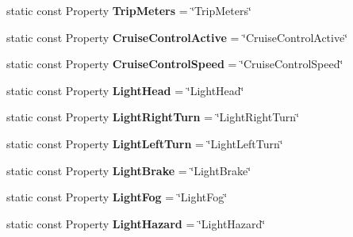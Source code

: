 \begin{DoxyCompactItemize}
\item 
\hypertarget{classVehicleProperty_a893b05cb0e292082070458efa6066e91}{static const Property {\bfseries Trip\+Meters} = \char`\"{}Trip\+Meters\char`\"{}}\label{classVehicleProperty_a893b05cb0e292082070458efa6066e91}

\item 
\hypertarget{classVehicleProperty_a3203c1cb22ff3b530a887228096863e5}{static const Property {\bfseries Cruise\+Control\+Active} = \char`\"{}Cruise\+Control\+Active\char`\"{}}\label{classVehicleProperty_a3203c1cb22ff3b530a887228096863e5}

\item 
\hypertarget{classVehicleProperty_a50c00b5a2d7cfd500a1cd7473124c737}{static const Property {\bfseries Cruise\+Control\+Speed} = \char`\"{}Cruise\+Control\+Speed\char`\"{}}\label{classVehicleProperty_a50c00b5a2d7cfd500a1cd7473124c737}

\item 
\hypertarget{classVehicleProperty_ae98356a8b49f28837a94b13094156e90}{static const Property {\bfseries Light\+Head} = \char`\"{}Light\+Head\char`\"{}}\label{classVehicleProperty_ae98356a8b49f28837a94b13094156e90}

\item 
\hypertarget{classVehicleProperty_a73cfc2a3afd2dc81f495936dfcf46793}{static const Property {\bfseries Light\+Right\+Turn} = \char`\"{}Light\+Right\+Turn\char`\"{}}\label{classVehicleProperty_a73cfc2a3afd2dc81f495936dfcf46793}

\item 
\hypertarget{classVehicleProperty_a4430db4d7c36d7d047766d88f9fc977c}{static const Property {\bfseries Light\+Left\+Turn} = \char`\"{}Light\+Left\+Turn\char`\"{}}\label{classVehicleProperty_a4430db4d7c36d7d047766d88f9fc977c}

\item 
\hypertarget{classVehicleProperty_aa4f2ae234bd0d045b95cf9980e980dd5}{static const Property {\bfseries Light\+Brake} = \char`\"{}Light\+Brake\char`\"{}}\label{classVehicleProperty_aa4f2ae234bd0d045b95cf9980e980dd5}

\item 
\hypertarget{classVehicleProperty_a6eb38fc244331a26b487f7f9beb69b0c}{static const Property {\bfseries Light\+Fog} = \char`\"{}Light\+Fog\char`\"{}}\label{classVehicleProperty_a6eb38fc244331a26b487f7f9beb69b0c}

\item 
\hypertarget{classVehicleProperty_a0d3992f2e0e50bb74baa5e670f6111f0}{static const Property {\bfseries Light\+Hazard} = \char`\"{}Light\+Hazard\char`\"{}}\label{classVehicleProperty_a0d3992f2e0e50bb74baa5e670f6111f0}


\end{DoxyCompactItemize}
